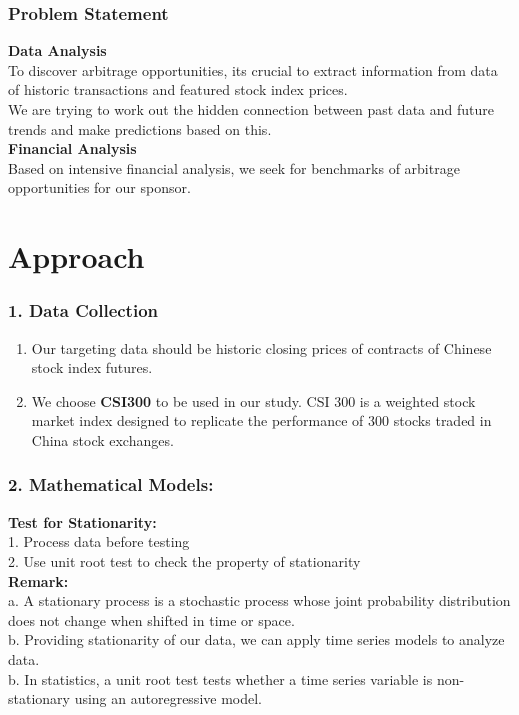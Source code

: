 \documentclass[compress,handout,10pt]{beamer}
\let\olditem\item
\renewcommand{\item}{\setlength{\itemsep}{0.5\baselineskip}\olditem}
\begin{document}
\begin{frame}
    \frametitle{Problem Statement}
{\bf{Data Analysis}} \\To discover arbitrage opportunities, its crucial to extract information from data of historic transactions and featured stock index prices. \\
We are trying to work out the hidden connection between past data and future trends and make predictions based on this.\\
\vspace{7pt}
{\bf{Financial Analysis}}\\ Based on intensive financial analysis, we seek for benchmarks of arbitrage opportunities for our sponsor.\\
\end{frame}

\section{Approach}
\begin{frame}
    \frametitle{1. Data Collection}
\begin{enumerate}
\item Our targeting data should be historic closing prices of contracts of Chinese stock index futures.
\item We choose {\bf{CSI300}} to be used in our study. CSI 300 is a weighted stock market index designed to replicate the performance of 300 stocks traded in China stock exchanges.
\end{enumerate}    
\end{frame}

\begin{frame}
    \frametitle{2. Mathematical Models:}
{\bf{Test for Stationarity:}}\\
\vspace{7pt}
1. Process data before testing\\
\vspace{5pt}
2. Use unit root test to check the property of stationarity\\
\vspace{10pt}
 {\bf{Remark:}} 
\\
\noindent a. A stationary process is a stochastic process whose joint probability distribution does not change when shifted in time or space.\\
b. Providing stationarity of our data, we can apply time series models to analyze data.\\
b. In statistics, a unit root test tests whether a time series variable is non-stationary using an autoregressive model.

\end{frame}
\end{document}
